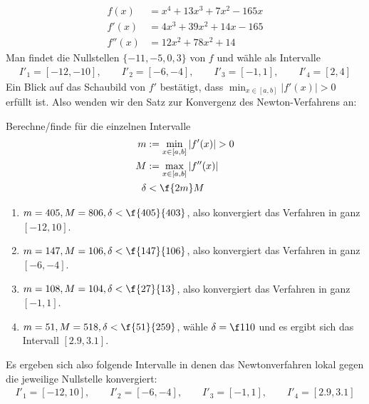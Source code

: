 \documentclass{mywork}
\begin{document}
\begin{aufgabe}~
	\begin{align*}
		f(x) &= x^4 + 13x^3 + 7x^2 - 165x \\
		f'(x) &= 4x^3 + 39x^2 + 14x - 165 \\
		f''(x) &= 12x^2 + 78x^2 + 14
	\end{align*}
	Man findet die Nullstellen $\{-11,-5,0,3\}$ von $f$ und wähle als Intervalle
	\begin{align*}
		I'_1 = [-12,-10], \qquad
		I'_2 = [-6,-4], \qquad
		I'_3 = [-1,1], \qquad
		I'_4 = [2,4]
	\end{align*}
	Ein Blick auf das Schaubild von $f'$ bestätigt, dass $\min_{x\in [a,b]} |f'(x)| > 0$ erfüllt ist.
	Also wenden wir den Satz zur Konvergenz des Newton-Verfahrens an:

	Berechne/finde für die einzelnen Intervalle
	\begin{align*}
		m &:= \min_{x\in [a,b]}|f'(x)| > 0 \\
		M &:= \max_{x\in [a,b]}|f''(x)| \\
		\delta &< \f {2m}M
	\end{align*}
	\begin{enumerate}[${I'}_1$:]
		\item $m=405, M=806, \delta < \f{405}{403}$, also konvergiert das Verfahren in ganz $[-12,10]$.
		\item $m=147, M=106, \delta < \f{147}{106}$, also konvergiert das Verfahren in ganz $[-6,-4]$.
		\item $m=108, M=104, \delta < \f{27}{13}$, also konvergiert das Verfahren in ganz $[-1,1]$.
		\item $m=51, M=518, \delta < \f{51}{259}$, wähle $\delta = \f 1{10}$ und es ergibt sich das Intervall $[2.9, 3.1]$.
	\end{enumerate}
	Es ergeben sich also folgende Intervalle in denen das Newtonverfahren lokal gegen die jeweilige Nullstelle konvergiert:
	\begin{align*}
		I'_1 = [-12,10], \qquad
		I'_2 = [-6,-4], \qquad
		I'_3 = [-1,1], \qquad
		I'_4 = [2.9, 3.1]
	\end{align*}
\end{aufgabe}
\end{document}
